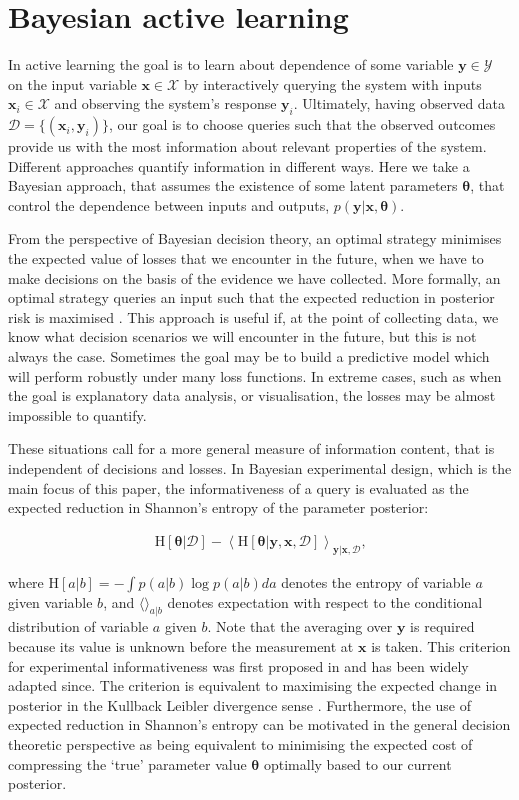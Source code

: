 \documentclass[twoside]{article}
\newcommand{\bx}{\bm{x}}
\newcommand{\by}{\bm{y}}
\newcommand{\param}{\bm{\theta}}
\newcommand{\x}{\bm{x}}
\newcommand{\y}{\bm{y}}
\newcommand{\data}{\mathcal{D}}
\begin{document}
\section{Bayesian active learning}

In active learning the goal is to learn about dependence of some variable $\y\in\mathcal{Y}$ on the input variable $\x\in\mathcal{X}$ by interactively querying the system with inputs $\x_i\in\mathcal{X}$ and observing the system's response $\y_i$. Ultimately, having observed data $\data = \{(\x_i,\y_i)\}$, our goal is to choose queries such that the observed outcomes provide us with the most information about relevant properties of the system. Different approaches quantify information in different ways. Here we take a Bayesian approach, that assumes the existence of some latent parameters $\param$, that control the dependence between inputs and outputs, $p(\y\vert\x,\param)$.

From the perspective of Bayesian decision theory, an optimal strategy minimises the expected value of losses that we encounter in the future, when we have to make decisions on the basis of the evidence we have collected. More formally, an optimal strategy queries an input such that the expected reduction in posterior risk is maximised \cite{Roy2001}. This approach is useful if, at the point of collecting data, we know what decision scenarios we will encounter in the future, but this is not always the case. Sometimes the goal may be to build a predictive model which will perform robustly under many loss functions. In extreme cases, such as when the goal is explanatory data analysis, or visualisation, the losses may be almost impossible to quantify.

These situations call for a more general measure of information content, that is independent of decisions and losses. In Bayesian experimental design, which is the main focus of this paper, the informativeness of a query is evaluated as the expected reduction in Shannon's entropy of the parameter posterior:

\begin{align}
	\mathrm{H}[\param | \data] - \left\langle \mathrm{H}[\param| \by, \bx, \data]\right\rangle_{\y\vert\x,\data}\mbox{,}\label{eqn:entropy_change}
\end{align}

where $\mathrm{H}[a\vert b] = - \int p(a \vert b) \log p(a\vert b)  da$ denotes the entropy of variable $a$ given variable $b$, and $\langle\rangle_{a\vert b}$ denotes expectation with respect to the conditional distribution of variable $a$ given $b$. Note that the averaging over $\y$ is required because its value is unknown before the measurement at $\bx$ is taken. This criterion for experimental informativeness was first proposed in \cite{lindley1956} and has been widely adapted since. The criterion is equivalent to maximising the expected change in posterior in the Kullback Leibler divergence sense \cite{MacKay1992}.  Furthermore, the use of expected reduction in Shannon's entropy can be motivated in the general decision theoretic perspective as being equivalent to minimising the expected cost of compressing the `true' parameter value $\param$ optimally based to our current posterior.
\end{document}

